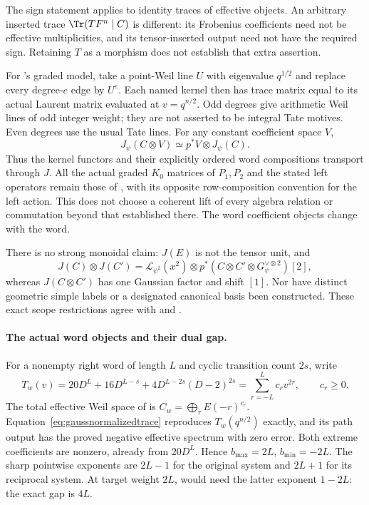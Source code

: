 The sign statement applies to identity traces of effective
objects. An arbitrary inserted trace $\Tr(TF^n\mid C)$ is
different: its Frobenius coefficients need not be effective
multiplicities, and its tensor-inserted output need not have
the required sign. Retaining $T$ as a morphism does not
establish that extra assertion.

For 's graded model, take a point-Weil line $U$
with eigenvalue $q^{1/2}$ and replace every degree-$e$
edge by $U^e$. Each named kernel then has trace matrix
equal to its actual Laurent matrix evaluated at
$v=q^{n/2}$. Odd degrees give arithmetic Weil lines of
odd integer weight; they are not asserted to be integral Tate
motives. Even degrees use the usual Tate lines.
For any constant coefficient space $V$,
\[
 J_\psi(C\otimes V)\simeq p^*V\otimes J_\psi(C).
\]
Thus the kernel functors and their explicitly ordered
word compositions transport through $J$. All the actual
graded $K_0$ matrices of $P_1,P_2$ and the stated left
operators remain those of , with its opposite
row-composition convention for the left action.
This does not choose a coherent lift of every algebra
relation or commutation beyond that established there.
The word coefficient objects change with the word.

There is no strong monoidal claim:
$J(E)$ is not the tensor unit, and
\[
 J(C)\otimes J(C')
 =\mathcal L_{\psi^2}(x^2)\otimes
     p^*(C\otimes C'\otimes G_\psi^{\vee\otimes2})[2],
\]
whereas $J(C\otimes C')$ has one Gaussian factor and
shift $[1]$. Nor have distinct geometric simple labels
or a designated canonical basis been constructed.
These exact scope restrictions agree with 
and .

\paragraph{The actual word objects and their dual gap.}
For a nonempty right word of length $L$ and cyclic
transition count $2s$, write
\[
 T_w(v)=20D^L+16D^{L-s}
          +4D^{L-2s}(D-2)^{2s}
       =\sum_{r=-L}^{L}c_rv^{2r},\qquad c_r\ge0.
\]
The total effective Weil space of  is
$C_w=\bigoplus_r E(-r)^{c_r}$.
Equation~\eqref{eq:gaussnormalizedtrace} reproduces
$T_w(q^{n/2})$ exactly, and its path output has the
proved negative effective spectrum with zero error.
Both extreme coefficients are nonzero, already from
$20D^L$. Hence $b_{\max}=2L$, $b_{\min}=-2L$.
The sharp pointwise exponents are $2L-1$ for the original
system and $2L+1$ for its reciprocal system. At target
weight $2L$,  would need the latter exponent
$1-2L$: the exact gap is $4L$.

